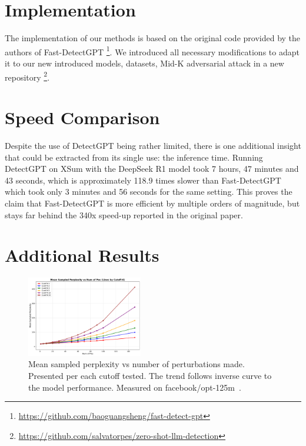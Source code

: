 \documentclass[11pt]{article}
\begin{document}
\appendix

\section{Implementation}

The implementation of our methods is based on the original code provided by the authors of Fast-DetectGPT \footnote{\url{https://github.com/baoguangsheng/fast-detect-gpt}}. We introduced all necessary modifications to adapt it to our new introduced models, datasets, Mid-K adversarial attack in a new repository \footnote{\url{https://github.com/salvatorpes/zero-shot-llm-detection}}.

\section{Speed Comparison}
Despite the use of DetectGPT being rather limited, there is one additional insight that could be extracted from its single use: the inference time. Running DetectGPT on XSum with the DeepSeek R1 model took 7 hours, 47 minutes and 43 seconds, which is approximately 118.9 times slower than Fast-DetectGPT which took only 3 minutes and 56 seconds for the same setting. This proves the claim that Fast-DetectGPT is more efficient by multiple orders of magnitude, but stays far behind the 340x speed-up reported in the original paper.

\section{Additional Results}
\label{appendix:perplexity}

\begin{figure}[H]
    \centering
    \includegraphics[width=0.45\textwidth]{graphs/attack/perplexity_main.pdf} %
    \caption{Mean sampled perplexity vs number of perturbations made. Presented per each cutoff tested. The trend follows inverse curve to the model performance. Measured on facebook/opt-125m~\cite{facebook125m}.}
    \label{fig:perplexity}
\end{figure}
\end{document}
